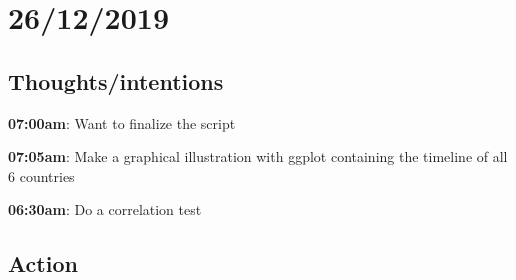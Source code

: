 \documentclass{article}
\begin{document}
\section{26/12/2019}
\subsection{Thoughts/intentions}
\textbf{07:00am}: Want to finalize the script

\textbf{07:05am}: Make a graphical illustration with ggplot containing the timeline of all 6 countries

\textbf{06:30am}: Do a correlation test

\subsection{Action}
\end{document}
